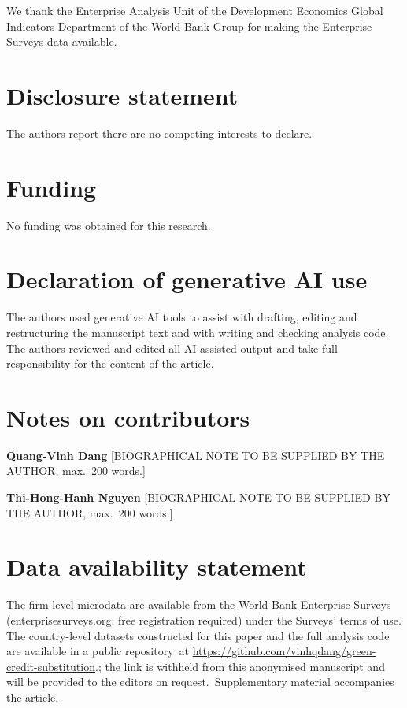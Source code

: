 \documentclass[review,authoryear,12pt]{elsarticle}
\begin{document}
We thank the Enterprise Analysis Unit of the Development Economics Global Indicators Department of the World Bank Group for making the Enterprise Surveys data available.
\fi

\section*{Disclosure statement}

The authors report there are no competing interests to declare.

\section*{Funding}

No funding was obtained for this research.

\section*{Declaration of generative AI use}

The authors used generative AI tools to assist with drafting, editing and restructuring the manuscript text and with writing and checking analysis code. The authors reviewed and edited all AI-assisted output and take full responsibility for the content of the article.

\ifdefined\withauthors
\section*{Notes on contributors}

\textbf{Quang-Vinh Dang} [BIOGRAPHICAL NOTE TO BE SUPPLIED BY THE AUTHOR, max.\ 200 words.]

\textbf{Thi-Hong-Hanh Nguyen} [BIOGRAPHICAL NOTE TO BE SUPPLIED BY THE AUTHOR, max.\ 200 words.]
\fi

\section*{Data availability statement}

The firm-level microdata are available from the World Bank Enterprise Surveys (enterprisesurveys.org; free registration required) under the Surveys' terms of use. The country-level datasets constructed for this paper and the full analysis code are available in a public repository\ifdefined\withauthors\ at \url{https://github.com/vinhqdang/green-credit-substitution}.\else; the link is withheld from this anonymised manuscript and will be provided to the editors on request.\fi\ Supplementary material accompanies the article.
\end{document}
